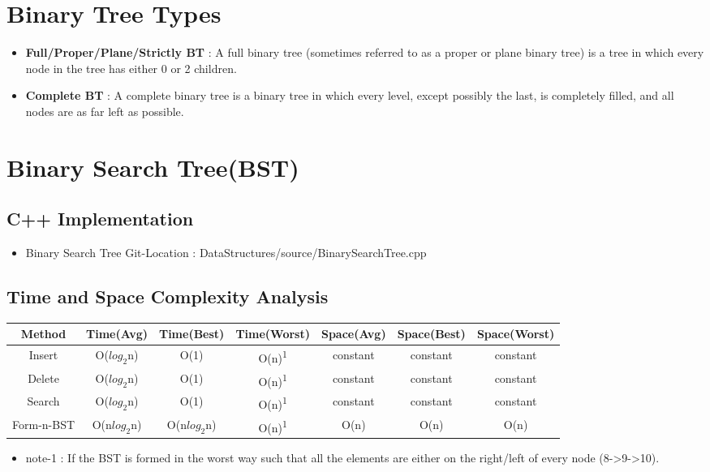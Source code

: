 \documentclass{article}
\begin{document}
\section{Binary Tree Types}
\begin{itemize}
\renewcommand{\labelitemi}{$\bullet$}
    \item \textbf{Full/Proper/Plane/Strictly BT} : A full binary tree (sometimes referred to as a proper or plane binary tree) is a tree in which every node in the tree has either 0 or 2 children.
    \item \textbf{Complete BT} : A complete binary tree is a binary tree in which every level, except possibly the last, is completely filled, and all nodes are as far left as possible.
\end{itemize}

\section{Binary Search Tree(BST)}
\subsection{C++ Implementation}
\begin{itemize}
\renewcommand{\labelitemi}{$\bullet$}
    \item Binary Search Tree Git-Location : DataStructures/source/BinarySearchTree.cpp
\end{itemize}
\subsection{Time and Space Complexity Analysis}
\begin{tabular}{c c c c c c c}
\hline\hline 
Method & Time(Avg) & Time(Best) & Time(Worst) & Space(Avg) & Space(Best) & Space(Worst) \\
\hline
Insert & O($log_{2}$n) & O(1) & O(n)\textsuperscript{1} & constant & constant & constant\\
Delete & O($log_{2}$n) & O(1) & O(n)\textsuperscript{1}  & constant & constant & constant \\
Search & O($log_{2}$n) & O(1) & O(n)\textsuperscript{1} & constant & constant & constant \\
Form-n-BST & O(n$log_{2}$n) & O(n$log_{2}$n) & O(n)\textsuperscript{1} & O(n) & O(n) & O(n) \\
\hline
\end{tabular}
\begin{itemize}
\renewcommand{\labelitemi}{$\bullet$}
    \item note-1 : If the BST is formed in the worst way such that all the elements are either on the right/left of every node (8->9->10).
\end{itemize} 
\end{document}
